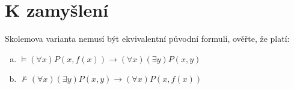         
\section*{K zamyšlení}

    
\begin{problem}
    
    Skolemova varianta nemusí být ekvivalentní původní formuli, ověřte, že platí:
    \begin{enumerate}[(a)]
        \item $\models (\forall x)P(x,f(x)) \to (\forall x)(\exists y)P(x,y)$
        \item $\not\models (\forall x)(\exists y)P(x,y)\to (\forall x)P(x,f(x))$
    \end{enumerate}

\end{problem}















 


